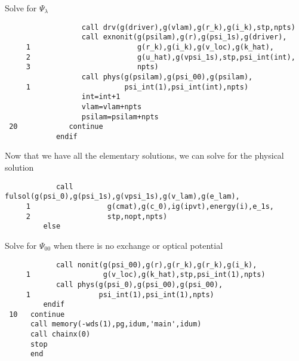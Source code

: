 \documentclass{article}
\begin{document}
                 Solve for $\Psi_{\lambda}$
\begin{verbatim}
                  call drv(g(driver),g(vlam),g(r_k),g(i_k),stp,npts)
                  call exnonit(g(psilam),g(r),g(psi_1s),g(driver),
     1                         g(r_k),g(i_k),g(v_loc),g(k_hat),
     2                         g(u_hat),g(vpsi_1s),stp,psi_int(int),
     3                         npts)
                  call phys(g(psilam),g(psi_00),g(psilam),
     1                      psi_int(1),psi_int(int),npts)
                  int=int+1
                  vlam=vlam+npts
                  psilam=psilam+npts
 20            continue
            endif
\end{verbatim}
        Now that we have all the elementary solutions, we can solve for the 
        physical solution
\begin{verbatim}
            call fulsol(g(psi_0),g(psi_1s),g(vpsi_1s),g(v_lam),g(e_lam),
     1                  g(cmat),g(c_0),ig(ipvt),energy(i),e_1s,
     2                  stp,nopt,npts)
         else
\end{verbatim}
           Solve for $\Psi_{00}$ when there is no exchange or optical
           potential
\begin{verbatim}
            call nonit(g(psi_00),g(r),g(r_k),g(r_k),g(i_k),
     1                 g(v_loc),g(k_hat),stp,psi_int(1),npts)
            call phys(g(psi_0),g(psi_00),g(psi_00),
     1                psi_int(1),psi_int(1),npts)
         endif
 10   continue   
      call memory(-wds(1),pg,idum,'main',idum)
      call chainx(0)               
      stop
      end
\end{verbatim}
\end{document}
